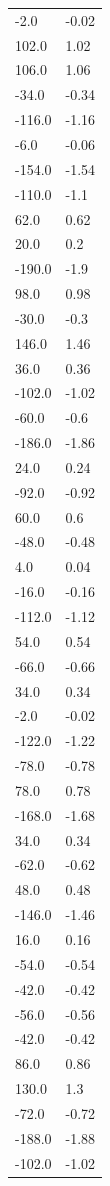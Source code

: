 \begin{longtable}{ll}
-2.0 & -0.02 \\
102.0 & 1.02 \\
106.0 & 1.06 \\
-34.0 & -0.34 \\
-116.0 & -1.16 \\
-6.0 & -0.06 \\
-154.0 & -1.54 \\
-110.0 & -1.1 \\
62.0 & 0.62 \\
20.0 & 0.2 \\
-190.0 & -1.9 \\
98.0 & 0.98 \\
-30.0 & -0.3 \\
146.0 & 1.46 \\
36.0 & 0.36 \\
-102.0 & -1.02 \\
-60.0 & -0.6 \\
-186.0 & -1.86 \\
24.0 & 0.24 \\
-92.0 & -0.92 \\
60.0 & 0.6 \\
-48.0 & -0.48 \\
4.0 & 0.04 \\
-16.0 & -0.16 \\
-112.0 & -1.12 \\
54.0 & 0.54 \\
-66.0 & -0.66 \\
34.0 & 0.34 \\
-2.0 & -0.02 \\
-122.0 & -1.22 \\
-78.0 & -0.78 \\
78.0 & 0.78 \\
-168.0 & -1.68 \\
34.0 & 0.34 \\
-62.0 & -0.62 \\
48.0 & 0.48 \\
-146.0 & -1.46 \\
16.0 & 0.16 \\
-54.0 & -0.54 \\
-42.0 & -0.42 \\
-56.0 & -0.56 \\
-42.0 & -0.42 \\
86.0 & 0.86 \\
130.0 & 1.3 \\
-72.0 & -0.72 \\
-188.0 & -1.88 \\
-102.0 & -1.02 \\

\end{longtable}
